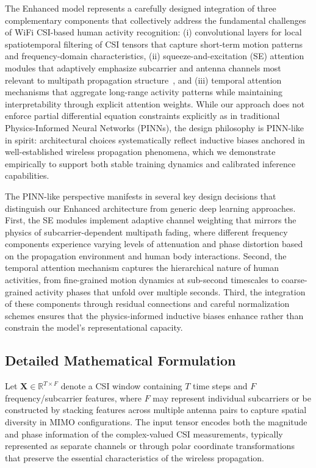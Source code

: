 \documentclass[journal]{IEEEtran}
\begin{document}
The Enhanced model represents a carefully designed integration of three complementary components that collectively address the fundamental challenges of WiFi CSI-based human activity recognition: (i) convolutional layers for local spatiotemporal filtering of CSI tensors that capture short-term motion patterns and frequency-domain characteristics, (ii) squeeze-and-excitation (SE) attention modules that adaptively emphasize subcarrier and antenna channels most relevant to multipath propagation structure~\cite{se_networks2018}, and (iii) temporal attention mechanisms that aggregate long-range activity patterns while maintaining interpretability through explicit attention weights. While our approach does not enforce partial differential equation constraints explicitly as in traditional Physics-Informed Neural Networks (PINNs), the design philosophy is PINN-like in spirit: architectural choices systematically reflect inductive biases anchored in well-established wireless propagation phenomena, which we demonstrate empirically to support both stable training dynamics and calibrated inference capabilities.

The PINN-like perspective manifests in several key design decisions that distinguish our Enhanced architecture from generic deep learning approaches. First, the SE modules implement adaptive channel weighting that mirrors the physics of subcarrier-dependent multipath fading, where different frequency components experience varying levels of attenuation and phase distortion based on the propagation environment and human body interactions. Second, the temporal attention mechanism captures the hierarchical nature of human activities, from fine-grained motion dynamics at sub-second timescales to coarse-grained activity phases that unfold over multiple seconds. Third, the integration of these components through residual connections and careful normalization schemes ensures that the physics-informed inductive biases enhance rather than constrain the model's representational capacity.

\subsection{Detailed Mathematical Formulation}

Let $\mathbf{X} \in \mathbb{R}^{T \times F}$ denote a CSI window containing $T$ time steps and $F$ frequency/subcarrier features, where $F$ may represent individual subcarriers or be constructed by stacking features across multiple antenna pairs to capture spatial diversity in MIMO configurations. The input tensor encodes both the magnitude and phase information of the complex-valued CSI measurements, typically represented as separate channels or through polar coordinate transformations that preserve the essential characteristics of the wireless propagation.
\end{document}
